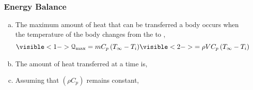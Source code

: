 \documentclass[10pt,compress,unknownkeysallowed]{beamer}
\begin{document}
\begin{frame}
 \frametitle{Energy Balance}
   \begin{enumerate}[(a)]%
     \item<1-> The maximum amount of heat that can be transferred  a body occurs when the temperature of the body changes from the  to ,
         \begin{displaymath}
             \visible<1->{\mathcal{Q}_{\text{max}} = m C_{p}\left(T_{\infty}-T_{i}\right)} \visible<2->{= \rho V C_{p}\left(T_{\infty}-T_{i}\right)} 
         \end{displaymath}
     \item<3-> The amount of heat  transferred at a time  is,
     \item<4-> Assuming that $\left(\rho C_{p}\right)$ remains constant,
   \end{enumerate} 
\end{frame}
\end{document}
